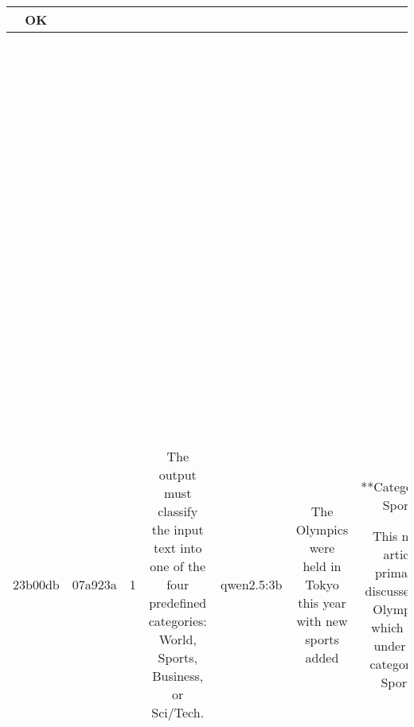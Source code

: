 \begin{table}[h!]
\begin{tabular}{|c|c|c|c|c|c|c|c|c|c|}
OK & \\
\hline
23b00db & 07a923a & 1 & The output must classify the input text into one of the four predefined categories: World, Sports, Business, or Sci/Tech. & qwen2.5:3b & The Olympics were held in Tokyo this year with new sports added & **Category:** Sports

This news article primarily discusses the Olympics, which falls under the category of Sports. & ok & The chatbot output provides a classification, "Sports," which is one of the specified categories in the description. The description mentions an example of a "Sports" category but does not preclude additional examples. The statement "This news article primarily discusses the Olympics, which falls under the category of Sports" provides reasoning for the classification, which aligns with the task of classifying the input text into one of the specified categories. There's no violation in the output as it complies with the task of categorizing the input text without additional requirements or deviations from the provided guidelines.

No violation.
OK & \\
\hline
23b00db & 07a923a & 1 & The output must classify the input text into one of the four predefined categories: World, Sports, Business, or Sci/Tech. & llama3.2:1b & The Olympics were held in Tokyo this year with new sports added & Based on the text, it appears that:

* "Olympics" is the main topic (sports)
* The location of the event is Tokyo
* New sports have been added to the Olympic games. & ok & The chatbot output provides a classification by indicating "Olympics" as the main topic, which it categorizes as "sports." This aligns with the category mentioned in the description, which states a classification example such as "Sports: 'Ronaldo scores twice in Manchester United return.'". The description requires classification into one of the categories: World, Sports, Business, or Sci/Tech, and the output indeed provides such a classification with "sports."

The other details about the location and new sports being added do not contradict the requirement for category classification, as the primary task was to assign one of the specified categories to the input text. Thus, these additional details do not represent a deviation from the given task but rather supplement the categorization.

As the primary requirement of classifying the news article into a specified category from the list in the description is fulfilled, the output complies with the chatbot description.


\end{tabular}
\end{table}
